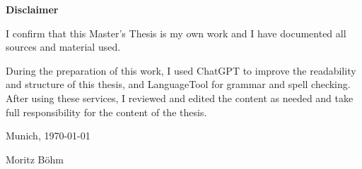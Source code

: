 \cleardoublepage{}
\thispagestyle{empty}

\vspace*{20mm}
\noindent

\makeatletter

\begin{center}
    {\textbf{Disclaimer}}
\end{center}

\begin{flushleft}
    {I confirm that this Master's Thesis is my own work and I have documented all sources and material used.

    During the preparation of this work, I used ChatGPT to improve the readability and structure of this thesis, and LanguageTool for grammar and spell checking. After using these services, I reviewed and edited the content as needed and take full responsibility for the content of the thesis.}


    

    \makeatother

    \vspace{15mm}
    \noindent

    Munich, \today{}

    Moritz Böhm
\end{flushleft}

\cleardoublepage{}
